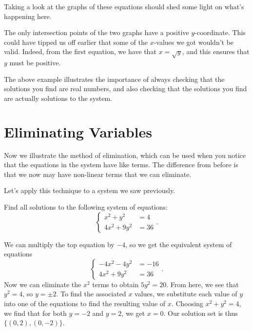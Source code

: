 \documentclass[nooutcomes]{ximera}
\begin{document}
Taking a look at the graphs of these equations should shed some light on what's happening here. 
\begin{image}
\end{image}

The only intersection points of the two graphs have a positive $y$-coordinate. This could have tipped us off earlier that some of the $x$-values we got wouldn't be valid. Indeed, from the first equation, we have that $x = \sqrt{y}$, and this ensures that $y$ must be positive. 

The above example illustrates the importance of always checking that the solutions you find are real numbers, and also checking that the solutions you find are actually solutions to the system. 

\section{Eliminating Variables}

Now we illustrate the method of elimination, which can be used when you notice that the equations in the system have like terms. The difference from before is that we now may have non-linear terms that we can eliminate.

Let's apply this technique to a system we saw previously.
\begin{example}
Find all solutions to the following system of equations:
$$
\begin{cases}
x^2 + y^2 & =  4 \\
4x^2 + 9y^2 & = 36
\end{cases}.
$$
\end{example}
\begin{explanation}
We can multiply the top equation by $-4$, so we get the equivalent system of equations
$$
\begin{cases}
-4x^2 - 4y^2 & =  -16 \\
4x^2 + 9y^2 & = 36
\end{cases}.
$$
Now we can eliminate the $x^2$ terms to obtain $5y^2 = 20$. From here, we see that $y^2 = 4$, so $y = \pm 2$.  To find the associated $x$ values, we substitute each value of $y$ into one of the equations to find the resulting value of $x$. Choosing $x^2 + y^2 = 4$,
we find that for both $y = -2$ and $y = 2$, we get $x = 0$. Our solution set is thus $\{(0, 2),(0, -2)\}$.
\end{explanation}
\end{document}
